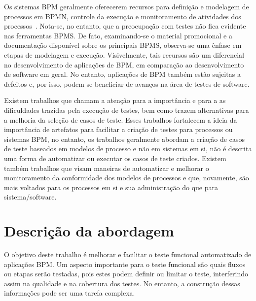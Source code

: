 \documentclass[12pt]{article}
\begin{document}
Os sistemas BPM geralmente oferecerem recursos para definição e modelagem de processos em BPMN, controle da execução e monitoramento de atividades dos processos~\cite{forrester}. Nota-se, no entanto, que a preocupação com testes não fica evidente nas ferramentas BPMS. De fato, examinando-se o material promocional e a documentação disponível sobre os principais BPMS, observa-se uma ênfase em etapas de modelagem e execução. Visivelmente, tais recursos são um diferencial no desenvolvimento de aplicações de BPM, em comparação ao desenvolvimento de software em geral. No entanto, aplicações de BPM também estão sujeitas a defeitos e, por isso, podem se beneficiar de avanços na área de testes de software.


Existem trabalhos que chamam a atenção para a importância e para a as dificuldades trazidas pela execução de testes, bem como trazem alternativas para a melhoria da seleção de casos de teste\cite{bohmer2015genetic}. Esses trabalhos fortalecem a ideia da importância de artefatos para facilitar a criação de testes para processos ou sistemas BPM, no entanto, os trabalhos geralmente abordam a criação de casos de teste baseados em modelos de processo e não em sistemas em si, não é descrita uma forma de automatizar ou executar os casos de teste criados. Existem também trabalhos que visam maneiras de automatizar e melhorar o monitoramento da conformidade dos modelos de processos \cite{ly2015compliance,van2012replaying} e que, novamente, são mais voltados para os processos em si e sua administração do que para sistema/software.

\section{Descrição da abordagem}
O objetivo deste trabalho é melhorar e facilitar o teste funcional automatizado de aplicações BPM. Um aspecto importante para o teste funcional são quais fluxos ou etapas serão testadas, pois estes podem definir ou limitar o teste, interferindo assim na qualidade e na cobertura dos testes. No entanto, a construção dessas informações pode ser uma tarefa complexa.
\end{document}
